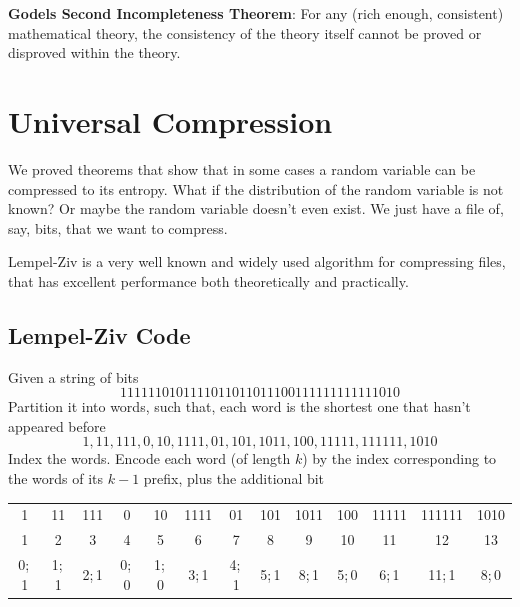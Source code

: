\documentclass{article}
\begin{document}
\textbf{Godels Second Incompleteness Theorem}: For any (rich enough, consistent) mathematical theory, the consistency of the theory itself cannot be proved or disproved within the theory.

\section{Universal Compression}

We proved theorems that show that in some cases a random variable can be compressed to its entropy. What if the distribution of the random variable is not known? Or maybe the random variable doesn't even exist. We just have a file of, say, bits, that we want to compress. 

Lempel-Ziv is a very well known and widely used algorithm for compressing files, that has excellent performance both theoretically and practically.

\subsection{Lempel-Ziv Code}

Given a string of bits 
\[
1111110101111011011011100111111111111010
\]
Partition it into words, such that, each word is the shortest one that hasn't appeared before
\[
1,11,111,0,10,1111,01,101,1011,100,11111,111111,1010
\]
Index the words. Encode each word (of length $k$) by the index corresponding to the words of its $k-1$ prefix, plus the additional bit

\begin{tabular}{c|c|c|c|c|c|c|c|c|c|c|c|c}
1 & 11 & 111 & 0 & 10 & 1111 & 01 & 101 & 1011 & 100 & 11111 & 111111 & 1010 \\
1 & 2 & 3 & 4 & 5 & 6 & 7 & 8 & 9 & 10 & 11 & 12 & 13 \\
0;\,1 & 1;\,1 & 2;\,1 & 0;\,0 & 1;\,0 & 3;\,1 & 4;\,1 & 5;\,1 & 8;\,1 & 5;\,0 & 6;\,1 & 11;\,1 & 8;\,0
\end{tabular}

\end{document}
